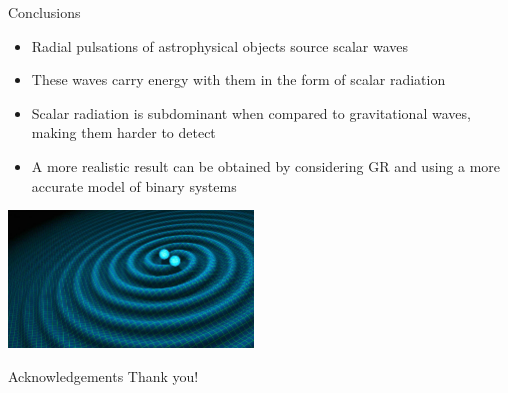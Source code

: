 \documentclass[10pt,t,handout]{beamer}
\begin{document}
\begin{frame}{Conclusions}
    \begin{itemize}[<+->]
        \centering  \item Radial pulsations of astrophysical objects source scalar waves
        \item These waves carry energy with them in the form of scalar radiation
        \item Scalar radiation is subdominant when compared to gravitational waves, making them harder to detect
        \item A more realistic result can be obtained by considering GR and using a more accurate model of binary systems
        
    \end{itemize}
    \vspace{5mm}
    \centering\includegraphics[width=6.5cm]{Images/ns_gw_art.jpg}
\end{frame}

\begin{frame}{Acknowledgements}
    \vspace{3cm}
    \centering \Huge Thank you!
\end{frame}
\end{document}
